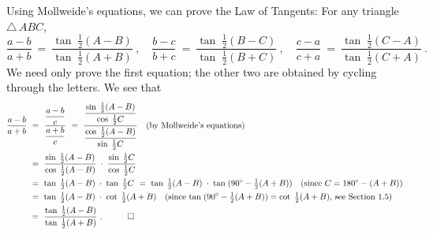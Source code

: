 \begin{exmp}\label{exmp:lawtanproof}
 Using Mollweide's equations, we can prove the Law of Tangents: For any triangle $\triangle\,ABC$,
 \begin{displaymath}
  \frac{a-b}{a+b} ~=~ \frac{\tan\;\frac{1}{2}(A-B)}{\tan\;\frac{1}{2}(A+B)} ~,\quad
  \frac{b-c}{b+c} ~=~ \frac{\tan\;\frac{1}{2}(B-C)}{\tan\;\frac{1}{2}(B+C)} ~,\quad
  \frac{c-a}{c+a} ~=~ \frac{\tan\;\frac{1}{2}(C-A)}{\tan\;\frac{1}{2}(C+A)} ~.
 \end{displaymath}
 We need only prove the first equation; the other two are obtained by cycling through the letters.
 We see that
 \begin{align*}
  \frac{a-b}{a+b} ~&=~ \dfrac{\dfrac{a-b}{c}}{\dfrac{a+b}{c}} ~=~
   \dfrac{\dfrac{\sin\;\tfrac{1}{2}(A-B)}{\cos\;\tfrac{1}{2}C}}{
   \dfrac{\cos\;\tfrac{1}{2}(A-B)}{\sin\;\tfrac{1}{2}C}}\quad\text{(by Mollweide's equations)}\\
  &=~ \dfrac{\sin\;\tfrac{1}{2}(A-B)}{\cos\;\tfrac{1}{2}(A-B)} \;\cdot\;
      \dfrac{\sin\;\tfrac{1}{2}C}{\cos\;\tfrac{1}{2}C}\\
  &=~ \tan\;\tfrac{1}{2}(A-B) \;\cdot\; \tan\;\tfrac{1}{2}C ~=~
      \tan\;\tfrac{1}{2}(A-B) \;\cdot\; \tan\;(90^\circ - \tfrac{1}{2}(A+B))
   \quad\text{(since $C=180^\circ - (A+B)$)}\\
  &=~ \tan\;\tfrac{1}{2}(A-B) \;\cdot\; \cot\;\tfrac{1}{2}(A+B)\quad\text{(since $\tan\;(90^\circ
     - \tfrac{1}{2}(A+B)) = \cot\;\tfrac{1}{2}(A+B)$, see Section 1.5)}\\
  &=~ \frac{\tan\;\frac{1}{2}(A-B)}{\tan\;\frac{1}{2}(A+B)} ~.\quad\qed
 \end{align*}
\end{exmp}
\divider\vspace{-2mm}
\newpage
